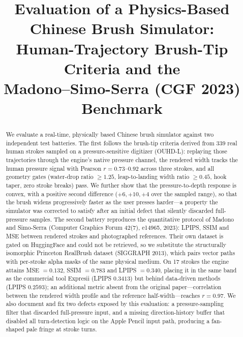 \documentclass[conference]{IEEEtran}
\begin{document}
\title{Evaluation of a Physics-Based Chinese Brush Simulator:\\
Human-Trajectory Brush-Tip Criteria and the\\Madono--Simo-Serra (CGF 2023) Benchmark}

\author{
}

\maketitle

\begin{abstract}
We evaluate a real-time, physically based Chinese brush simulator against two
independent test batteries. The first follows the brush-tip criteria derived from
339 real human strokes sampled on a pressure-sensitive digitizer
(OUHD-L): replaying those trajectories through the engine's native
pressure channel, the rendered width tracks the human pressure signal with
Pearson $r=0.73$--$0.92$ across three strokes, and all geometry gates
(water-drop ratio $\ge 1.25$, leap-to-landing width ratio $\ge 0.45$,
hook taper, zero stroke breaks) pass. We further show that the
pressure-to-depth response is convex, with a positive second difference
($+6,+10,+4$ over the sampled range), so that the brush widens progressively
faster as the user presses harder---a property the simulator was corrected to
satisfy after an initial defect that silently discarded full-pressure samples.
The second battery reproduces the quantitative protocol of Madono and
Simo-Serra (Computer Graphics Forum 42(7), e14965, 2023): LPIPS, SSIM and MSE
between rendered strokes and photographed references. Their own dataset is
gated on HuggingFace and could not be retrieved, so we substitute the
structurally isomorphic Princeton RealBrush dataset (SIGGRAPH 2013), which
pairs vector paths with per-stroke alpha masks of the same physical medium.
On 17 strokes the engine attains MSE $=0.132$, SSIM $=0.783$ and
LPIPS $=0.340$, placing it in the same band as the commercial tool Expresii
(LPIPS $0.3413$) but behind data-driven methods (LPIPS $0.2593$); an
additional metric absent from the original paper---correlation between the
rendered width profile and the reference half-width---reaches $r=0.97$.
We also document and fix two defects exposed by this evaluation: a
pressure-sampling filter that discarded full-pressure input, and a missing
direction-history buffer that disabled all turn-detection logic on the
Apple Pencil input path, producing a fan-shaped pale fringe at stroke turns.
\end{abstract}
\end{document}
